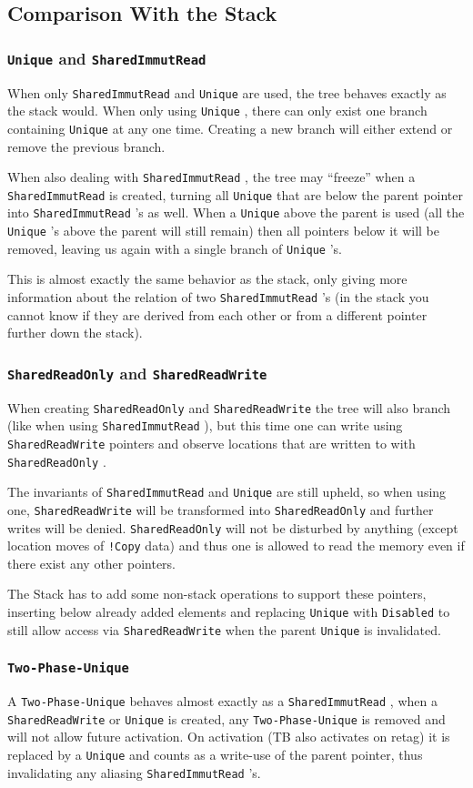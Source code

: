 \documentclass[]{article}
\newcommand{\SHRW}{\texttt{SharedReadWrite} }
\newcommand{\SHRO}{\texttt{SharedReadOnly} }
\newcommand{\SHIR}{\texttt{SharedImmutRead} }
\newcommand{\UNQ}{\texttt{Unique} }
\newcommand{\TPU}{\texttt{Two-Phase-Unique} }
\begin{document}
\subsection{Comparison With the Stack}
\subsubsection{\UNQ and \SHIR}
When only \SHIR and \UNQ are used, the tree behaves exactly as the stack would.
When only using \UNQ, there can only exist one branch containing \UNQ at any one time. Creating a new branch will either extend or remove the previous branch.

When also dealing with \SHIR, the tree may ``freeze'' when a \SHIR is created, turning all \UNQ that are below the parent pointer into \SHIR's as well. When a \UNQ above the parent is used (all the \UNQ's above the parent will still remain) then all pointers below it will be removed, leaving us again with a single branch of \UNQ's.

This is almost exactly the same behavior as the stack, only giving more information about the relation of two \SHIR's (in the stack you cannot know if they are derived from each other or from a different pointer further down the stack).

\subsubsection{\SHRO and \SHRW}
When creating \SHRO and \SHRW the tree will also branch (like when using \newline\SHIR), but this time one can write using \SHRW pointers and observe locations that are written to with \SHRO.

The invariants of \SHIR and \UNQ are still upheld, so when using one, \SHRW will be transformed into \SHRO and further writes will be denied. \SHRO will not be disturbed by anything (except location moves of \texttt{!Copy} data) and thus one is allowed to read the memory even if there exist any other pointers.

The Stack has to add some non-stack operations to support these pointers, inserting below already added elements and replacing \UNQ with \texttt{Disabled} to still allow access via \SHRW when the parent \UNQ is invalidated.

\subsubsection{\TPU}
A \TPU behaves almost exactly as a \SHIR, when a \SHRW or \UNQ is created, any \TPU is removed and will not allow future activation. On activation (TB also activates on retag) it is replaced by a \UNQ and counts as a write-use of the parent pointer, thus invalidating any aliasing \SHIR's.
\end{document}
